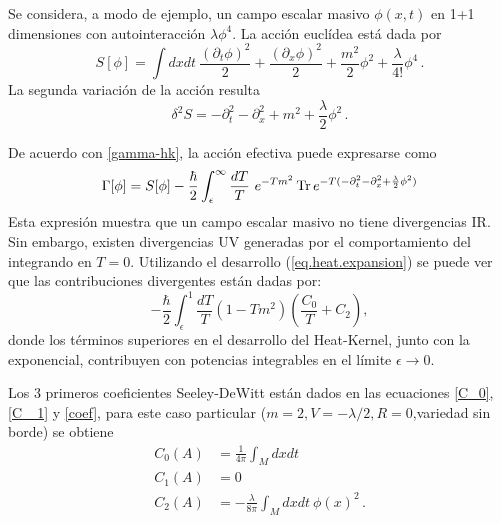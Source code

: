 Se considera, a modo de ejemplo, un campo escalar masivo $\phi(x,t)$ en 1+1 dimensiones con autointeracción $\lambda \phi ^4 $. La acción euclídea está dada por
\begin{equation}
S[ \phi ] = \int dx dt \ 
\frac{( \partial _t \phi ) ^2}{2} +  
\frac{( \partial _x \phi ) ^2}{2} +
\frac{m ^2 }{2} \phi ^2 +
\frac{\lambda}{4!} \phi ^4 \,.
\end{equation}
La segunda variación de la acción resulta
\begin{equation}
\delta ^2 S = 
- \partial _t ^2 
- \partial _x ^2 
+ m ^2 
+ \frac{\lambda}{2}\phi ^2 \,.
\end{equation}


De acuerdo con \eqref{gamma-hk}, la acción efectiva puede expresarse como
\begin{equation}\label{eq.accion-efectiva}
\Gamma [ \phi ] = 
S[ \phi ] - 
\frac{\hbar }{2}
\int _ { \epsilon } ^{\infty} \frac{ dT}{T} 
\ e ^{- T m ^2 }
\,{\rm Tr} \,  e ^{- T ( - \partial _t ^2 - \partial _x ^2 + \frac{\lambda}{2} \phi ^2 ) }
\end{equation}
Esta expresión muestra que un campo escalar masivo no tiene divergencias IR. Sin embargo, existen divergencias UV generadas por el comportamiento del integrando en $T=0$. Utilizando el desarrollo (\ref{eq.heat.expansion}) se puede ver que las contribuciones divergentes están dadas por:
\begin{equation}\label{seeley-div}
- \frac{\hbar }{2}\int _ { \epsilon } ^{1}  
\frac{ dT}{T} 
\left(
		1 - T m^2
		\right)
\left(
		\frac{C _0}{T} + C _2 
		\right),
\end{equation}
donde los términos superiores en el  desarrollo del Heat-Kernel, junto con la exponencial, contribuyen con potencias integrables en el límite $\epsilon \rightarrow 0 $.

Los 3 primeros coeficientes Seeley-DeWitt están dados en las ecuaciones \eqref{C_0}, \eqref{C _1} y \eqref{coef}, para este caso particular ($m=2, V = - \lambda /2,R=0$,variedad sin borde) se obtiene
\begin{align}
C _0 (A) &= \frac{1}{4 \pi   }  \int  _{M} d x dt   \\[2mm]
C _1 (A) &= 0 \\[2mm]
C _2 (A) &= - \frac{ \lambda }{8 \pi }  \int _M d x dt \  \phi (x) ^2 \, .
\label{coef2}
\end{align} 


